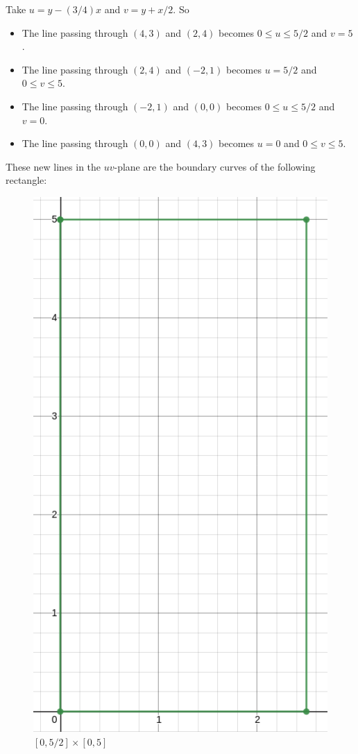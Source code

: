 	Take $u = y - (3/4)x$ and $v = y + x/2$. So
		\begin{itemize}
		\item The line passing through $(4, 3)$ and $(2, 4)$ becomes $0 \leq u \leq 5/2$ and $v = 5$.
		\item The line passing through $(2, 4)$ and $(-2, 1)$ becomes $u = 5/2 $ and $0 \leq v \leq 5$.
		\item The line passing through $(-2, 1)$ and $(0, 0)$ becomes $0 \leq u \leq 5/2$ and $v = 0$.
		\item The line passing through $(0, 0)$ and $(4, 3)$ becomes $u = 0$ and $0 \leq v \leq 5$.
		\end{itemize}
	These new lines in the $uv$-plane are the boundary curves of the following rectangle:
		\begin{figure}[h]
		\centering
		\includegraphics[scale=0.16]{rectangle-15-9_Prob12.png}
		\caption{$[0, 5/2] \times [0, 5]$}
		\end{figure}
	
